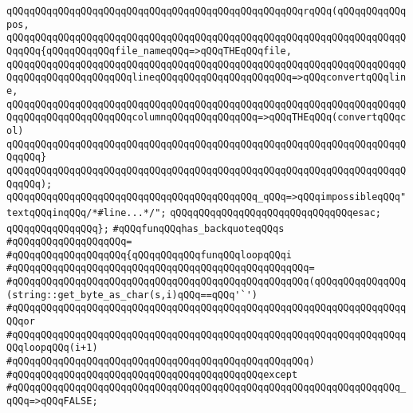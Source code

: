 \verb|qQQqqQQqqQQqqQQqqQQqqQQqqQQqqQQqqQQqqQQqqQQqqQQqqQQqrqQQq(qQQqqQQqqQQqpos,|\newline
\verb|qQQqqQQqqQQqqQQqqQQqqQQqqQQqqQQqqQQqqQQqqQQqqQQqqQQqqQQqqQQqqQQqqQQqqQQqqQQq{qQQqqQQqqQQqfile_nameqQQq=>qQQqTHEqQQqfile,|\newline
\verb|qQQqqQQqqQQqqQQqqQQqqQQqqQQqqQQqqQQqqQQqqQQqqQQqqQQqqQQqqQQqqQQqqQQqqQQqqQQqqQQqqQQqqQQqqQQqlineqQQqqQQqqQQqqQQqqQQqqQQq=>qQQqconvertqQQqline,|\newline
\verb|qQQqqQQqqQQqqQQqqQQqqQQqqQQqqQQqqQQqqQQqqQQqqQQqqQQqqQQqqQQqqQQqqQQqqQQqqQQqqQQqqQQqqQQqqQQqcolumnqQQqqQQqqQQqqQQq=>qQQqTHEqQQq(convertqQQqcol)|\newline
\verb|qQQqqQQqqQQqqQQqqQQqqQQqqQQqqQQqqQQqqQQqqQQqqQQqqQQqqQQqqQQqqQQqqQQqqQQqqQQq}|\newline
\verb|qQQqqQQqqQQqqQQqqQQqqQQqqQQqqQQqqQQqqQQqqQQqqQQqqQQqqQQqqQQqqQQqqQQqqQQqqQQq);|\newline
\newline
\verb|qQQqqQQqqQQqqQQqqQQqqQQqqQQqqQQqqQQqqQQqqQQq_qQQq=>qQQqimpossibleqQQq"textqQQqinqQQq/*#line...*/";|\newline
\newline
\verb|qQQqqQQqqQQqqQQqqQQqqQQqqQQqqQQqesac;|\newline
\verb|qQQqqQQqqQQqqQQq};|\newline
\newline
\verb|#qQQqfunqQQqhas_backquoteqQQqs|\newline
\verb|#qQQqqQQqqQQqqQQqqQQq=|\newline
\verb|#qQQqqQQqqQQqqQQqqQQq{qQQqqQQqqQQqfunqQQqloopqQQqi|\newline
\verb|#qQQqqQQqqQQqqQQqqQQqqQQqqQQqqQQqqQQqqQQqqQQqqQQqqQQq=|\newline
\verb|#qQQqqQQqqQQqqQQqqQQqqQQqqQQqqQQqqQQqqQQqqQQqqQQqqQQq(qQQqqQQqqQQqqQQq(string::get_byte_as_char(s,i)qQQq==qQQq'`')|\newline
\verb|#qQQqqQQqqQQqqQQqqQQqqQQqqQQqqQQqqQQqqQQqqQQqqQQqqQQqqQQqqQQqqQQqqQQqqQQqor|\newline
\verb|#qQQqqQQqqQQqqQQqqQQqqQQqqQQqqQQqqQQqqQQqqQQqqQQqqQQqqQQqqQQqqQQqqQQqqQQqloopqQQq(i+1)|\newline
\verb|#qQQqqQQqqQQqqQQqqQQqqQQqqQQqqQQqqQQqqQQqqQQqqQQqqQQq)|\newline
\verb|#qQQqqQQqqQQqqQQqqQQqqQQqqQQqqQQqqQQqqQQqqQQqexcept|\newline
\verb|#qQQqqQQqqQQqqQQqqQQqqQQqqQQqqQQqqQQqqQQqqQQqqQQqqQQqqQQqqQQqqQQqqQQq_qQQq=>qQQqFALSE;|\newline
